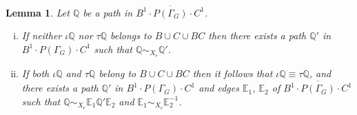 \documentclass[11pt]{amsart}
\newtheorem{lem}{Lemma}
\theoremstyle{plain}
\begin{document}
\begin{lem}\label{newlemma}
Let ${\mathbb{Q}}$ be a path in $\overline{B^1 \cdot P(\Gamma_G) \cdot C^1}$. 
\begin{enumerate}[(i)]
\item If neither $\iota {\mathbb{Q}}$ nor $\tau {\mathbb{Q}}$ belongs to $B \cup C \cup BC$ then there exists a path ${\mathbb{Q}}'$ in $B^1 \cdot P(\Gamma_G) \cdot C^1$ such that ${\mathbb{Q}} \sim_{X_e} {\mathbb{Q}}'$.
\item If both $\iota {\mathbb{Q}}$ and $\tau {\mathbb{Q}}$ belong to $B \cup C \cup BC$ then it follows that $\iota {\mathbb{Q}} \equiv \tau {\mathbb{Q}}$, and there exists a path ${\mathbb{Q}}'$ in $B^1 \cdot P(\Gamma_G) \cdot C^1$ and edges ${\mathbb{E}}_1$, ${\mathbb{E}}_2$ of $\overline{B^1 \cdot P(\Gamma_G) \cdot C^1}$ such that ${\mathbb{Q}} \sim_{X_e} {\mathbb{E}}_1 {\mathbb{Q}}' {\mathbb{E}}_2$ and ${\mathbb{E}}_1 \sim_{X_e} {\mathbb{E}}_2^{-1}$.  
\end{enumerate}
\end{lem}
\end{document}
